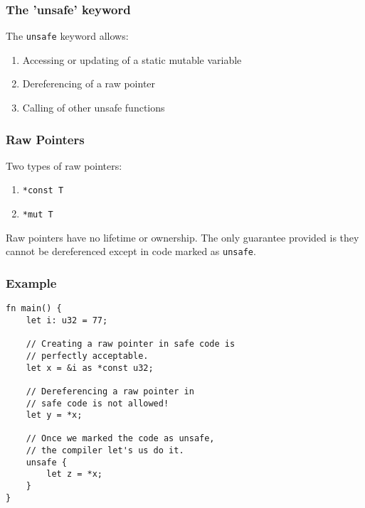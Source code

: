 \documentclass{beamer}
\begin{document}
\begin{frame}
	\frametitle{The 'unsafe' keyword}
	The \texttt{unsafe} keyword allows:
	\begin{enumerate}
		\item Accessing or updating of a static mutable variable
		\item Dereferencing of a raw pointer
		\item Calling of other unsafe functions
	\end{enumerate}
\end{frame}
\begin{frame}[fragile]
	\frametitle{Raw Pointers}
	Two types of raw pointers:
	\begin{enumerate}
		\item \texttt{*const T}
		\item \texttt{*mut T}
	\end{enumerate}
	\vspace{1cm}
	Raw pointers have no lifetime or ownership. The only guarantee provided is they cannot be dereferenced except in code marked as \texttt{unsafe}.
\end{frame}
\begin{frame}[fragile]
	\frametitle{Example}
	\begin{verbatim}
fn main() {
	let i: u32 = 77;

	// Creating a raw pointer in safe code is 
	// perfectly acceptable.
	let x = &i as *const u32; 

	// Dereferencing a raw pointer in 
	// safe code is not allowed!
	let y = *x;

	// Once we marked the code as unsafe, 
	// the compiler let's us do it.
	unsafe {
		let z = *x;
	}
}
	\end{verbatim}
\end{frame}
\end{document}
